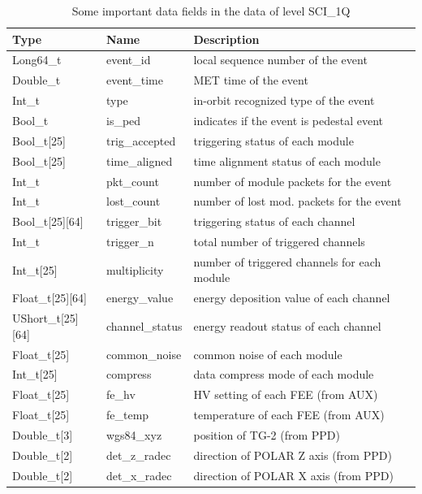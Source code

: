 \documentclass{raa}
\begin{document}
\begin{table}[!ht]
\centering
\small
\caption{Some important data fields in the data of level SCI\_1Q}\label{tab:sci_1q}
\begin{tabular}{|l|l|l|}\hline
Type\tablefootnote{\url{https://root.cern.ch/root/atlfast/html/ListOfTypes.html}} & Name & Description \\\hline\hline
Long64\_t & event\_id & local sequence number of the event \\\hline
Double\_t & event\_time & MET time of the event\\\hline
Int\_t & type & in-orbit recognized type of the event\\\hline
Bool\_t & is\_ped & indicates if the event is pedestal event \\\hline
Bool\_t[25] & trig\_accepted & triggering status of each module \\\hline
Bool\_t[25] & time\_aligned & time alignment status of each module \\\hline
Int\_t & pkt\_count & number of module packets for the event \\\hline
Int\_t & lost\_count & number of lost mod. packets for the event \\\hline
Bool\_t[25][64] & trigger\_bit & triggering status of each channel \\\hline
Int\_t & trigger\_n & total number of triggered channels \\\hline
Int\_t[25] & multiplicity & number of triggered channels for each module \\\hline
Float\_t[25][64] & energy\_value & energy deposition value of each channel \\\hline
UShort\_t[25][64] & channel\_status & energy readout status of each channel \\\hline
Float\_t[25] & common\_noise & common noise of each module \\\hline
Int\_t[25] & compress & data compress mode of each module \\\hline
Float\_t[25] & fe\_hv & HV setting of each FEE (from AUX) \\\hline
Float\_t[25] & fe\_temp & temperature of each FEE (from AUX) \\\hline
Double\_t[3] & wgs84\_xyz & position of TG-2 (from PPD) \\\hline
Double\_t[2] & det\_z\_radec & direction of POLAR Z axis (from PPD) \\\hline
Double\_t[2] & det\_x\_radec & direction of POLAR X axis (from PPD) \\\hline
\end{tabular}
\end{table}
\end{document}
